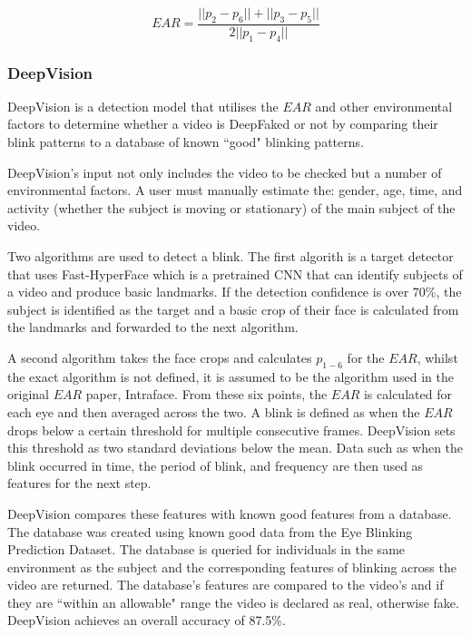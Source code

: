 \begin{equation}
    \label{eq:ear}
    EAR=\frac{||p_2-p_6|| + ||p_3-p_5||}{2||p_1-p_4||}
\end{equation}

\subsubsection{DeepVision}

DeepVision\cite{jung2020deepvision} is a detection model that utilises the $EAR$ and other environmental factors to determine whether a video is DeepFaked or not by comparing their blink patterns to a database of known ``good" blinking patterns.

DeepVision's input not only includes the video to be checked but a number of environmental factors. A user must manually estimate the: gender, age, time, and activity (whether the subject is moving or stationary) of the main subject of the video. 

Two algorithms are used to detect a blink. The first algorith is a target detector that uses Fast-HyperFace\cite{ranjan2017hyperface} which is a pretrained CNN that can identify subjects of a video and produce basic landmarks. If the detection confidence is over 70\%, the subject is identified as the target and a basic crop of their face is calculated from the landmarks and forwarded to the next algorithm.

A second algorithm takes the face crops and calculates $p_{1-6}$ for the $EAR$, whilst the exact algorithm is not defined, it is assumed to be the algorithm used in the original $EAR$ paper, Intraface\cite{xiong2013supervised}. From these six points, the $EAR$ is calculated for each eye and then averaged across the two. A blink is defined as when the $EAR$ drops below a certain threshold for multiple consecutive frames. DeepVision sets this threshold as two standard deviations below the mean. Data such as when the blink occurred in time, the period of blink, and frequency are then used as features for the next step.

DeepVision compares these features with known good features from a database. The database was created using known good data from the Eye Blinking Prediction Dataset\cite{turing2018eye}. The database is queried for individuals in the same environment as the subject and the corresponding features of blinking across the video are returned. The database's features are compared to the video's and if they are ``within an allowable" range the video is declared as real, otherwise fake. DeepVision achieves an overall accuracy of 87.5\%.

